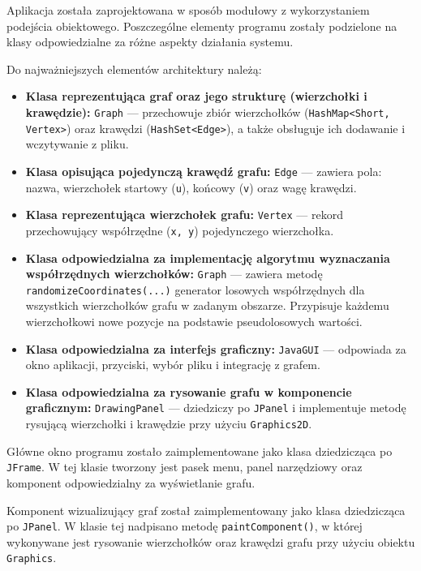 \documentclass[11pt,a4paper]{article}
\begin{document}
Aplikacja została zaprojektowana w sposób modułowy z wykorzystaniem podejścia obiektowego. Poszczególne elementy programu zostały podzielone na klasy odpowiedzialne za różne aspekty działania systemu.

Do najważniejszych elementów architektury należą:

\begin{itemize}
    \item \textbf{Klasa reprezentująca graf oraz jego strukturę (wierzchołki i krawędzie):}
    \texttt{Graph} — przechowuje zbiór wierzchołków (\texttt{HashMap<Short, Vertex>}) oraz krawędzi (\texttt{HashSet<Edge>}), a także obsługuje ich dodawanie i wczytywanie z pliku.

    \item \textbf{Klasa opisująca pojedynczą krawędź grafu:} \texttt{Edge} — zawiera pola: nazwa, wierzchołek startowy (\texttt{u}), końcowy (\texttt{v}) oraz wagę krawędzi.

    \item \textbf{Klasa reprezentująca wierzchołek grafu:}
    \texttt{Vertex} — rekord przechowujący współrzędne (\texttt{x, y}) pojedynczego wierzchołka.

    \item \textbf{Klasa odpowiedzialna za implementację algorytmu wyznaczania współrzędnych wierzchołków:}  \texttt{Graph} — zawiera metodę \texttt{randomizeCoordinates(...)} generator losowych współrzędnych dla wszystkich wierzchołków grafu w zadanym obszarze. Przypisuje każdemu wierzchołkowi nowe pozycje na podstawie pseudolosowych wartości.

    \item \textbf{Klasa odpowiedzialna za interfejs graficzny:}
    \texttt{JavaGUI} — odpowiada za okno aplikacji, przyciski, wybór pliku i integrację z grafem.

    \item \textbf{Klasa odpowiedzialna za rysowanie grafu w komponencie graficznym:}
    \texttt{DrawingPanel} — dziedziczy po \texttt{JPanel} i implementuje metodę rysującą wierzchołki i krawędzie przy użyciu \texttt{Graphics2D}.
\end{itemize}

Główne okno programu zostało zaimplementowane jako klasa dziedzicząca po \verb|JFrame|. W tej klasie tworzony jest pasek menu, panel narzędziowy oraz komponent odpowiedzialny za wyświetlanie grafu.

Komponent wizualizujący graf został zaimplementowany jako klasa dziedzicząca po \verb|JPanel|. W klasie tej nadpisano metodę \verb|paintComponent()|, w której wykonywane jest rysowanie wierzchołków oraz krawędzi grafu przy użyciu obiektu \verb|Graphics|.
\end{document}

